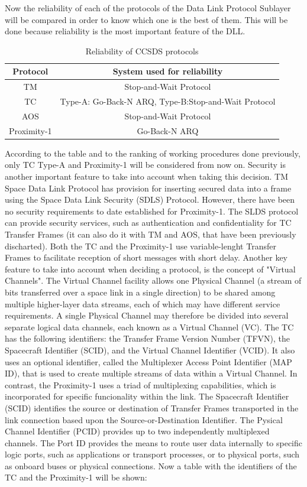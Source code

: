 \documentclass[12pt,a4paper]{report}
\begin{document}
Now the reliability of each of the protocols of the Data Link Protocol Sublayer will be compared in order to know which one is the best of them. This will be done because reliability is the most important feature of the DLL.
\begin{table}[H]
\begin{center}
\begin{tabular}{|c|c|}
\hline
\textbf{Protocol}&\textbf{System used for reliability}\\
\hline
TM&Stop-and-Wait Protocol\\
\hline
TC&Type-A: Go-Back-N ARQ, Type-B:Stop-and-Wait Protocol\\
\hline
AOS&Stop-and-Wait Protocol\\
\hline
Proximity-1&Go-Back-N ARQ\\
\hline
\end{tabular}
\caption{Reliability of CCSDS protocols}
\end{center}
\end{table}
According to the table and to the ranking of working procedures done previously, only TC Type-A and Proximity-1 will be considered from now on. Security is another important feature to take into account when taking this decision. TM Space Data Link Protocol has provision for inserting secured data into a frame using the Space Data Link Security (SDLS) Protocol. However, there have been no security requirements to date established for Proximity-1. The SLDS protocol can provide security services, such as authentication and confidentiality for TC Transfer Frames (it can also do it with TM and AOS, that have been previously discharted). Both the TC and the Proximity-1 use variable-lenght Transfer Frames to facilitate reception of short messages with short delay. Another key feature to take into account when deciding a protocol, is the concept of "Virtual Channels". The
Virtual Channel facility allows one Physical Channel (a stream of bits transferred over a
space link in a single direction) to be shared among multiple higher-layer data streams, each
of which may have different service requirements. A single Physical Channel may therefore
be divided into several separate logical data channels, each known as a Virtual Channel
(VC). The TC has the following identifiers: the Transfer Frame Version Number (TFVN), the Spacecraft Identifier (SCID), and the Virtual Channel Identifier (VCID). It also uses an optional identifier, called the Multiplexer Access Point Identifier (MAP ID), that is used to create multiple streams of data within a Virtual Channel. In contrast, the Proximity-1 uses a triad of multiplexing capabilities, which is incorporated for specific funcionality within the link. The Spacecraft Identifier (SCID) identifies the source or destination of Transfer Frames transported in the link connection based upon the Source-or-Destination Identifier. The Pysical Channel Identifier (PCID) provides up to two independently multiplexed channels. The Port ID provides the means to route user data internally to specific logic ports, such as applications or transport processes, or to physical ports, such as onboard buses or physical connections. Now a table with the identifiers of the TC and the Proximity-1 will be shown:
\end{document}
